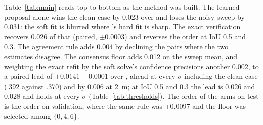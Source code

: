 \begin{table}[t]
  \centering\small
  \caption{\textbf{\vxreal test, sweep means at three IoU thresholds.} Paired standard errors over five seeds.}
  \label{tab:thresholds}
\end{table}

Table~\ref{tab:main} reads top to bottom as the method was built. The learned proposal alone wins the clean case by 0.023 over \freealign and loses the noisy sweep by 0.031: the soft fit is blurred where \freealign's hard fit is sharp. The exact verification recovers 0.026 of that (paired, $\pm0.0003$) and reverses the order at IoU 0.5 and 0.3. The agreement rule adds 0.004 by declining the pairs where the two estimates disagree. The consensus floor adds 0.012 on the sweep mean, and weighting the exact refit by the soft solve's confidence precisions another 0.002, to a paired lead of $+0.0141\pm0.0001$ over \freealign, ahead at every $\sigma$ including the clean case (.392 against .370) and by 0.006 at \SI{2}{m}; at IoU 0.5 and 0.3 the lead is 0.026 and 0.028 and holds at every $\sigma$ (Table~\ref{tab:thresholds}). The order of the arms on test is the order on validation, where the same rule was +0.0097 and the floor was selected among $\{0,4,6\}$.

